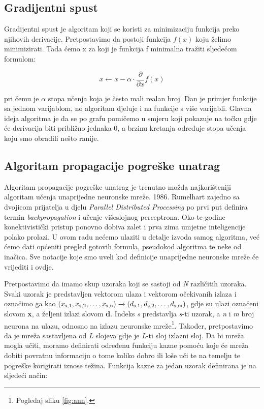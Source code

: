 \documentclass[times, utf8, zavrsni]{fer}
\begin{document}
\subsection{Gradijentni spust}
Gradijentni spust  je algoritam koji se koristi za minimizaciju funkcija preko njihovih derivacije. Pretpostavimo da postoji funkcija $f(x)$ koju želimo minimizirati. Tada ćemo x za koji je funkcija f minimalna tražiti sljedećom formulom:

\begin{equation}
    \label{eq:grad}
    x \leftarrow x - \alpha \cdot{\frac{\partial}{\partial x}}f(x)
\end{equation}

pri čemu je $\alpha$ stopa učenja koja je često mali realan broj. Dan je primjer funkcije sa jednom varijablom, no algoritam djeluje i na funkcije s više varijabli. Glavna ideja algoritma je da se po grafu pomičemo u smjeru koji pokazuje na točku gdje će derivacija biti približno jednaka 0, a brzinu kretanja određuje stopa učenja koju smo obradili nešto ranije.

\subsection{Algoritam propagacije pogreške unatrag}
Algoritam propagacije pogreške unatrag  je trenutno možda najkorišteniji algoritam učenja unaprijedne neuronske mreže. 1986. Rumelhart zajedno sa dvojicom prijatelja u djelu \textit{Parallel Distributed Processing} po prvi put definira termin \textit{backpropagation} i učenje višeslojnog perceptrona. Oko te godine konektivistički pristup ponovno dobiva zalet i prva zima umjetne inteligencije polako prolazi. U ovom radu nećemo ulaziti u detalje izvoda samog algoritma, već ćemo dati općeniti pregled gotovih formula, pseudokod algoritma te neke od inačica. Sve notacije koje smo uveli kod definicije unaprijedne neuronske mreže će vrijediti i ovdje.

Pretpostavimo da imamo skup uzoraka koji se sastoji od \textit{N} različitih uzoraka. Svaki uzorak je predstavljen vektorom ulaza i vektorom očekivanih izlaza i označimo ga kao $(x\textsubscript{s,1}, x\textsubscript{s,2},\dots, x\textsubscript{s,n}) \xrightarrow{} (d\textsubscript{s,1}, d\textsubscript{s,2},\dots, d\textsubscript{s,m})$, gdje su ulazi označeni slovom \textbf{x}, a željeni izlazi slovom \textbf{d}. Indeks \textit{s} predstavlja \textit{s}-ti uzorak, a \textit{n} i \textit{m} broj neurona na ulazu, odnosno na izlazu neuronske mreže\footnote{Pogledaj sliku \ref{fig:ann}.}. Također, pretpostavimo da je mreža sastavljena od \textit{L} slojeva gdje je \textit{L}-ti sloj izlazni sloj. Da bi mreža mogla učiti, moramo definirati određenu funkciju kazne pomoću koje će mreža dobiti povratnu informaciju o tome koliko dobro ili loše uči te na temelju te pogreške korigirati iznose težina. Funkcija kazne za jedan uzorak definirana je na sljedeći način:
\end{document}
